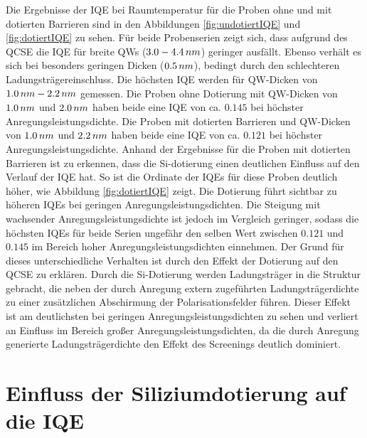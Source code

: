 \noindent 
Die Ergebnisse der IQE bei Raumtemperatur für die Proben ohne und mit dotierten Barrieren sind in den Abbildungen 
\ref{fig:undotiertIQE} und \ref{fig:dotiertIQE} zu sehen. Für beide Probenserien zeigt sich, dass aufgrund des QCSE die IQE für breite QWs 
($3.0 - 4.4 \thinspace nm$) geringer ausfällt. Ebenso verhält es sich bei besonders geringen Dicken ($0.5\thinspace nm$), bedingt durch den schlechteren Ladungsträgereinschluss. Die höchsten IQE werden für QW-Dicken von $1.0 \thinspace nm- 2.2 \thinspace nm$ gemessen. Die Proben ohne Dotierung mit QW-Dicken von $1.0 \thinspace nm$ und $2.0\thinspace nm$ haben beide eine IQE von ca. $0.145$ bei höchster Anregungsleistungsdichte.
\newline
Die Proben mit dotierten Barrieren und QW-Dicken von $1.0 \thinspace nm$ und $2.2\thinspace nm$ haben beide eine IQE von ca. $0.121$ bei höchster Anregungsleistungsdichte. 
\newline
Anhand der Ergebnisse für die Proben mit dotierten Barrieren ist zu erkennen, dass die Si-dotierung einen deutlichen Einfluss auf den Verlauf der IQE hat. So ist die Ordinate der IQEs für diese Proben deutlich höher, wie Abbildung \ref{fig:dotiertIQE} zeigt. Die Dotierung führt sichtbar zu höheren IQEs bei geringen Anregungsleistungsdichten. Die Steigung mit wachsender Anregungsleistungsdichte ist jedoch im Vergleich geringer, sodass die höchsten IQEs für beide Serien ungefähr den selben Wert zwischen $0.121$ und $0.145$ im Bereich hoher Anregungsleistungsdichten einnehmen. 
\newline
Der Grund für dieses unterschiedliche Verhalten ist durch den Effekt der Dotierung auf den QCSE zu erklären. Durch die Si-Dotierung werden Ladungsträger in die Struktur gebracht, die neben der durch Anregung extern zugeführten Ladungsträgerdichte zu einer zusätzlichen Abschirmung der Polarisationsfelder führen. Dieser Effekt ist am deutlichsten bei geringen Anregungsleistungsdichten zu sehen und verliert an Einfluss im Bereich großer Anregungsleistungsdichten, da die durch Anregung generierte Ladungsträgerdichte den Effekt des Screenings deutlich dominiert.

\iffalse
\section{Einfluss der Siliziumdotierung auf die IQE}

